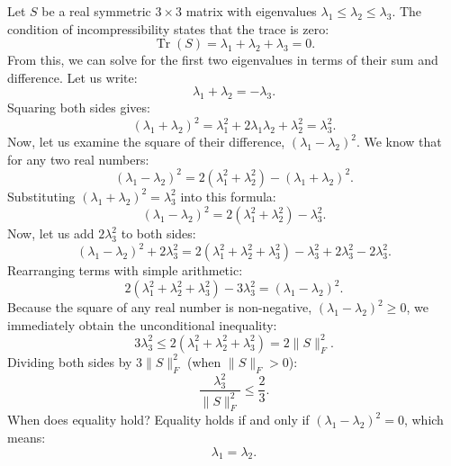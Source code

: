 \documentclass[11pt,a4paper]{article}
\theoremstyle{definition}
\begin{document}
Let $S$ be a real symmetric $3 \times 3$ matrix with eigenvalues $\lambda_1 \le \lambda_2 \le \lambda_3$. The condition of incompressibility states that the trace is zero:
\begin{equation}
\operatorname{Tr}(S) = \lambda_1 + \lambda_2 + \lambda_3 = 0.
\end{equation}
From this, we can solve for the first two eigenvalues in terms of their sum and difference. Let us write:
\begin{equation}
\lambda_1 + \lambda_2 = -\lambda_3.
\end{equation}
Squaring both sides gives:
\begin{equation}
(\lambda_1 + \lambda_2)^2 = \lambda_1^2 + 2\lambda_1\lambda_2 + \lambda_2^2 = \lambda_3^2.
\end{equation}
Now, let us examine the square of their difference, $(\lambda_1 - \lambda_2)^2$. We know that for any two real numbers:
\begin{equation}
(\lambda_1 - \lambda_2)^2 = 2(\lambda_1^2 + \lambda_2^2) - (\lambda_1 + \lambda_2)^2.
\end{equation}
Substituting $(\lambda_1 + \lambda_2)^2 = \lambda_3^2$ into this formula:
\begin{equation}
(\lambda_1 - \lambda_2)^2 = 2(\lambda_1^2 + \lambda_2^2) - \lambda_3^2.
\end{equation}
Now, let us add $2\lambda_3^2$ to both sides:
\begin{equation}
(\lambda_1 - \lambda_2)^2 + 2\lambda_3^2 = 2(\lambda_1^2 + \lambda_2^2 + \lambda_3^2) - \lambda_3^2 + 2\lambda_3^2 - 2\lambda_3^2.
\end{equation}
Rearranging terms with simple arithmetic:
\begin{equation}
2(\lambda_1^2 + \lambda_2^2 + \lambda_3^2) - 3\lambda_3^2 = (\lambda_1 - \lambda_2)^2.
\end{equation}
Because the square of any real number is non-negative, $(\lambda_1 - \lambda_2)^2 \ge 0$, we immediately obtain the unconditional inequality:
\begin{equation}
3\lambda_3^2 \le 2(\lambda_1^2 + \lambda_2^2 + \lambda_3^2) = 2\|S\|_F^2.
\end{equation}
Dividing both sides by $3\|S\|_F^2$ (when $\|S\|_F > 0$):
\begin{equation}
\frac{\lambda_3^2}{\|S\|_F^2} \le \frac{2}{3}.
\end{equation}
When does equality hold? Equality holds if and only if $(\lambda_1 - \lambda_2)^2 = 0$, which means:
\begin{equation}
\lambda_1 = \lambda_2.
\end{equation}
\end{document}
